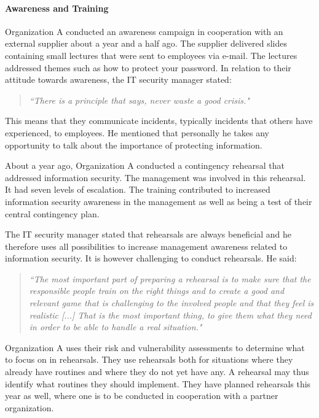 \paragraph{Awareness and Training}
Organization A conducted an awareness campaign in cooperation with an external supplier about a year and a half ago. The supplier delivered slides containing small lectures that were sent to employees via e-mail. The lectures addressed themes such as how to protect your password. In relation to their attitude towards awareness, the IT security manager stated: 

\begin{quote}
\textit{``There is a principle that says, never waste a good crisis."}
\end{quote}

This means that they communicate incidents, typically incidents that others have experienced, to employees. He mentioned that personally he takes any opportunity to talk about the importance of protecting information.

About a year ago, Organization A conducted a contingency rehearsal that addressed information security. The management was involved in this rehearsal. It had seven levels of escalation. The training contributed to increased information security awareness in the management as well as being a test of their central contingency plan.

The IT security manager stated that rehearsals are always beneficial and he therefore uses all possibilities to increase management awareness related to information security. It is however challenging to conduct rehearsals. He said:

\begin{quote}
\textit{``The most important part of preparing a rehearsal is to make sure that the responsible people train on the right things and to create a good and relevant game that is challenging to the involved people and that they feel is realistic [...] That is the most important thing, to give them what they need in order to be able to handle a real situation."}
\end{quote}

Organization A uses their risk and vulnerability assessments to determine what to focus on in rehearsals. They use rehearsals both for situations where they already have routines and where they do not yet have any. A rehearsal may thus identify what routines they should implement. They have planned rehearsals this year as well, where one is to be conducted in cooperation with a partner organization. 

